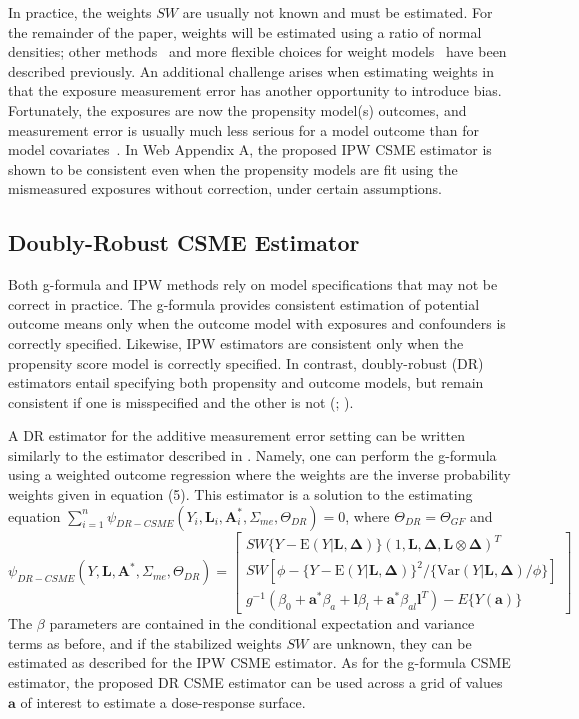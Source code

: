 \documentclass[useAMS,usenatbib,referee]{biom}
\begin{document}
In practice, the weights $SW$ are usually not known and must be estimated. For the remainder of the paper, weights will be estimated using a ratio of normal densities; other methods~\citep{hirano2004} and more flexible choices for weight models~\citep{naimi2014} have been described previously. An additional challenge arises when estimating weights in that the exposure measurement error has another opportunity to introduce bias. Fortunately, the exposures are now the propensity model(s) outcomes, and measurement error is usually much less serious for a model outcome than for model covariates~\citep{carroll2006}. In Web Appendix A, the proposed IPW CSME estimator is shown to be consistent even when the propensity models are fit using the mismeasured exposures without correction, under certain assumptions.

\subsection{Doubly-Robust CSME Estimator}

Both g-formula and IPW methods rely on model specifications that may not be correct in practice. The g-formula provides consistent estimation of potential outcome means only when the outcome model with exposures and confounders is correctly specified. Likewise, IPW estimators are consistent only when the propensity score model is correctly specified. In contrast, doubly-robust (DR) estimators entail specifying both propensity and outcome models, but remain consistent if one is misspecified and the other is not (\citealp*{robins1994}; \citealp{lunceford2004,bang2005}).

A DR estimator for the additive measurement error setting can be written similarly to the estimator described in \citet{hirano2001}. Namely, one can perform the g-formula using a weighted outcome regression where the weights are the inverse probability weights given in equation (5). This estimator is a solution to the estimating equation $\sum_{i=1}^{n} \psi_{DR-CSME}(Y_{i}, \bm{L}_{i}, \bm{A}_{i}^{*}, \Sigma_{me}, \Theta_{DR}) = 0$, where $\Theta_{DR} = \Theta_{GF}$ and
\begin{equation}
    \psi_{DR-CSME}(Y, \bm{L}, \bm{A}^{*}, \Sigma_{me}, \Theta_{DR}) =
    \begin{bmatrix}
       SW\{ Y - \text{E}(Y | \bm{L}, \bm{\Delta}) \} (1, \bm{L}, \bm{\Delta}, \bm{L} \otimes \bm{\Delta})^{T} \\
        SW[\phi - \{ Y - \text{E}(Y | \bm{L}, \bm{\Delta}) \}^{2} / \{ \text{Var}(Y | \bm{L}, \bm{\Delta}) / \phi \}] \\
        g^{-1}(\beta_{0} + \bm{a}^{*}\beta_{a} + \bm{l}\beta_{l} +
        \bm{a}^{*}\beta_{al}\bm{l}^{T}) - E \{ Y(\bm{a}) \}
    \end{bmatrix}
\end{equation}
The $\beta$ parameters are contained in the conditional expectation and variance terms as before, and if the stabilized weights $SW$ are unknown, they can be estimated as described for the IPW CSME estimator. As for the g-formula CSME estimator, the proposed DR CSME estimator can be used across a grid of values $\bm{a}$ of interest to estimate a dose-response surface.
\end{document}
